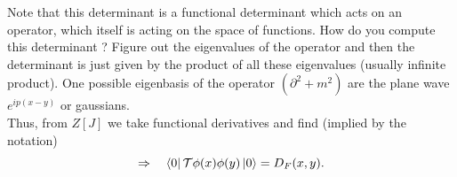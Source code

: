 Note that this determinant is a functional determinant which acts on an operator, which itself is acting on the space of functions. How do you compute this determinant ? Figure out the eigenvalues of the operator and then the determinant is just given by the product of all these eigenvalues (usually infinite product). One possible eigenbasis of the operator $(\partial^2+m^2)$ are the plane wave $e^{ip(x-y)}$ or gaussians.\\
Thus, from $Z[J]$ we take functional derivatives and find (implied by the notation)
\begin{equation*}
\Rightarrow\quad \bra{0} \mathcal{T}\phi(x) \phi(y) \ket{0} = D_F(x,y).
\end{equation*}









